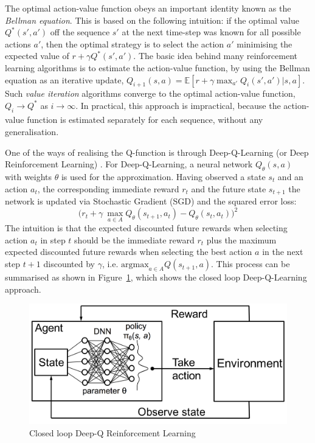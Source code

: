 The optimal action-value function obeys an important identity known as the \textit{Bellman equation}. This is based on the following intuition: if the optimal value $Q^*(s',a')$ off the sequence $s'$ at the next time-step was known for all possible actions $a'$, then the optimal strategy is to select the action $a'$ minimising the expected value of $r + \gamma Q^*(s',a')$.
The basic idea behind many reinforcement learning algorithms is to estimate the action-value function, by using the Bellman equation as an iterative update, $Q_{i+1}(s,a) = \mathbb{E}[r+\gamma \max_{a'}Q_i(s',a')| s,a]$. Such \textit{value iteration} algorithms converge to the optimal action-value function, $Q_i \xrightarrow[]{} Q^*$ as $i \xrightarrow[]{} \infty$\cite{sutton2018reinforcement}. In practical, this approach is impractical, because the action-value function is estimated separately for each sequence, without any generalisation. 

One of the ways of realising the Q-function is through Deep-Q-Learning (or Deep Reinforcement Learning) \cite{Zhu:2017:BTP:3127479.3128605}.  For Deep-Q-Learning, a neural network $Q_\theta(s,a)$ with weights $\theta$ is used for the approximation. Having observed a state $s_t$ and an action $a_t$, the corresponding immediate reward $r_t$ and the future state $s_{t+1}$ the network is updated via Stochastic Gradient (SGD) and the squared error loss:
\begin{equation}
    \bigg( r_t + \gamma\ \max_{a \in A} Q_\theta(s_{t+1},a_t) - Q_\theta(s_t, a_t) \bigg)^2
\end{equation}
The intuition is that the expected discounted future rewards when selecting action $a_t$ in step $t$ should be the immediate reward $r_t$ plus the maximum expected discounted future rewards when selecting the best action $a$ in the next step $t+1$ discounted by $\gamma$, i.e. $\text{argmax}_{a \in A} Q(s_{t+1},a)$. This process can be summarised as shown in Figure~\ref{fig:dqn}, which shows the closed loop Deep-Q-Learning approach.

\begin{figure}[h]
  \centering
  \includegraphics[width=\linewidth]{figures/dqn.png}
  \caption{Closed loop Deep-Q Reinforcement Learning}
  \label{fig:dqn}
\end{figure}


